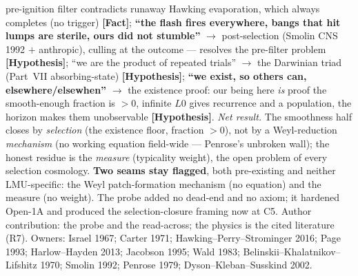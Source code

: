 \documentclass[11pt]{article}
\newcommand{\Fact}{\textbf{\textcolor{green!45!black}{[Fact]}}}
\newcommand{\Hyp}{\textbf{\textcolor{blue!55!black}{[Hypothesis]}}}
\begin{document}
pre-ignition filter contradicts runaway Hawking evaporation, which always completes (no trigger) \Fact; \textbf{``the flash fires everywhere, bangs that hit lumps are sterile, ours did not stumble''} $\to$ post-selection (Smolin CNS 1992 $+$ anthropic), culling at the outcome --- resolves the pre-filter problem \Hyp; ``we are the product of repeated trials'' $\to$ the Darwinian triad (Part~VII absorbing-state) \Hyp; \textbf{``we exist, so others can, elsewhere/elsewhen''} $\to$ the existence proof: our being here \emph{is} proof the smooth-enough fraction is $>0$, infinite $L0$ gives recurrence and a population, the horizon makes them unobservable \Hyp. \emph{Net result.} The smoothness half closes by \emph{selection} (the existence floor, fraction $>0$), not by a Weyl-reduction \emph{mechanism} (no working equation field-wide --- Penrose's unbroken wall); the honest residue is the \emph{measure} (typicality weight), the open problem of every selection cosmology. \textbf{Two seams stay flagged}, both pre-existing and neither LMU-specific: the Weyl patch-formation mechanism (no equation) and the measure (no weight). The probe added no dead-end and no axiom; it hardened Open-1A and produced the selection-closure framing now at C5. Author contribution: the probe and the read-across; the physics is the cited literature (R7). Owners: Israel 1967; Carter 1971; Hawking--Perry--Strominger 2016; Page 1993; Harlow--Hayden 2013; Jacobson 1995; Wald 1983; Belinskii--Khalatnikov--Lifshitz 1970; Smolin 1992; Penrose 1979; Dyson--Kleban--Susskind 2002.
\end{document}
